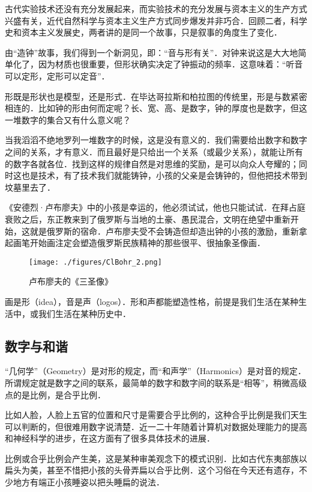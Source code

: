 古代实验技术还没有充分发展起来，而实验技术的充分发展与资本主义的生产方式兴盛有关，近代自然科学与资本主义生产方式同步爆发并非巧合．回顾二者，科学史和资本主义发展史，两者讲的是同一个故事，只是叙事的角度生了变化．

由“造钟”故事，我们得到一个新洞见，即：“音与形有关”．对钟来说这是大大地简单化了，因为材质也很重要，但形状确实决定了钟振动的频率．这意味着：“听音可以定形，定形可以定音”．

形既是形状也是模型，还是形式．在毕达哥拉斯和柏拉图的传统里，形是与数紧密相连的．比如钟的形由何而定呢？长、宽、高、是数字，钟的厚度也是数字，但这一堆数字的集合又有什么意义呢？

当我滔滔不绝地罗列一堆数字的时候，这是没有意义的．我们需要给出数字和数字之间的关系，才有意义．而且最好是只给出一个关系（或最少关系），就能让所有的数字各就各位．找到这样的规律自然是对思维的奖励，是可以向众人夸耀的；同时这也是技术，有了技术我们就能铸钟，小孩的父亲是会铸钟的，但他把技术带到坟墓里去了．

《安德烈·卢布廖夫》中的小孩是幸运的，他必须试试，他也只能试试．在拜占庭衰败之后，东正教来到了俄罗斯与当地的土豪、愚民混合，文明在绝望中重新开始，这就是俄罗斯的宿命．卢布廖夫受不会铸造但却造出钟的小孩的激励，重新拿起画笔开始画注定会塑造俄罗斯民族精神的那些很平、很抽象圣像画．

\begin{figure}[ht]
\centering
\texttt{[image: ./figures/ClBohr\_2.png]}
\caption{卢布廖夫的《三圣像》} \label{ClBohr_fig2}
\end{figure}

画是形（idea），音是声（logos）．形和声都能塑造性格，前提是我们生活在某种生活中，或我们生活在某种历史中．

\subsection{数字与和谐}

“几何学”（Geometry）是对形的规定，而“和声学”（Harmonics）是对音的规定．所谓规定就是数字之间的联系，最简单的数字和数字间的联系是“相等”，稍微高级点的是比例，是合乎比例．

比如人脸，人脸上五官的位置和尺寸是需要合乎比例的，这种合乎比例是我们天生可以判断的，但很难用数字说清楚．近一二十年随着计算机对数据处理能力的提高和神经科学的进步，在这方面有了很多具体技术的进展．

比例或合乎比例会产生美，这是某种审美观念下的模式识别．比如古代东夷部族以扁头为美，甚至不惜把小孩的头骨弄扁以合乎比例．这个习俗在今天还有遗存，不少地方有端正小孩睡姿以把头睡扁的说法．

